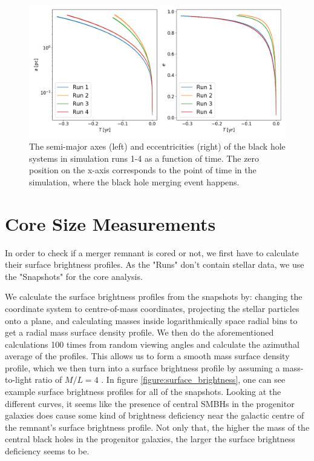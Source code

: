 \documentclass[english, oneside]{HYgradu}
\begin{document}
\begin{figure}[h]
	\centering
	\includegraphics[width=\textwidth]{semi_major_and_ecc.png}
	\caption{The semi-major axes (left) and eccentricities (right) of the black hole systems in simulation runs 1-4 as a function of time. The zero position on the x-axis corresponds to the point of time in the simulation, where the black hole merging event happens.}
\end{figure}

\section{Core Size Measurements}

In order to check if a merger remnant is cored or not, we first have to calculate their surface brightness profiles. As the "Runs" don't contain stellar data, we use the "Snapshots" for the core analysis. 

We calculate the surface brightness profiles from the snapshots by: changing the coordinate system to centre-of-mass coordinates, projecting the stellar particles onto a plane, and calculating masses inside logarithmically space radial bins to get a radial mass surface density profile. We then do the aforementioned calculations 100 times from random viewing angles and calculate the azimuthal average of the profiles. This allows us to form a smooth mass surface density profile, which we then turn into a surface brightness profile by assuming a mass-to-light ratio of $M/L = 4$ \citep{Rantala2018}. In figure \ref{figure:surface_brightness}, one can see example surface brightness profiles for all of the snapshots. Looking at the different curves, it seems like the presence of central SMBHs in the progenitor galaxies does cause some kind of brightness deficiency near the galactic centre of the remnant's surface brightness profile. Not only that, the higher the mass of the central black holes in the progenitor galaxies, the larger the surface brightness deficiency seems to be.
\end{document}
